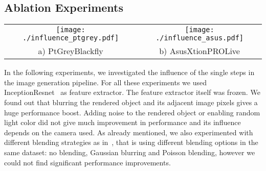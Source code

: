 \documentclass[10pt,twocolumn,letterpaper]{article}
\newcommand{\asus}[0]{AsusXtionPROLive\xspace}
\newcommand{\ptgrey}[0]{PtGreyBlackfly\xspace}
\begin{document}


\subsection{Ablation Experiments}
\label{sec:influence}

\begin{figure*}[ht]
\begin{center}
\begin{tabular}{cc}
\texttt{[image: ./influence\_ptgrey.pdf]} &
\texttt{[image: ./influence\_asus.pdf]} \\
a) \ptgrey &
b) \asus \\
\end{tabular}
\end{center}
\caption{\label{fig:influence} Influences  of the different building  blocks for
  synthetic  rendering for  the \ptgrey  and  the \asus  cameras.  Results  were
  obtained   with   InceptionResnet~\cite{inception_resnet}   as   the   feature
  extractor. Blurring is clearly a useful yet simple operation to apply to the
  synthetic images to improve the results.}
\end{figure*}

In the following experiments, we investigated  the influence of the single steps
in  the  image   generation  pipeline.   For  all  these   experiments  we  used
InceptionResnet~\cite{inception_resnet}  as  feature   extractor.   The  feature
extractor itself was frozen.  We found out that blurring the rendered object and
its adjacent image  pixels gives a huge performance boost.   Adding noise to the
rendered object or enabling random light  color did not give much improvement in
performance and its influence depends on the camera used.  As already mentioned,
we also experimented with  different blending strategies as in~\cite{Dwibedi17},
that  is using  different blending  options in  the same  dataset: no  blending,
Gaussian blurring  and Poisson blending,  however we could not  find significant
performance improvements.
\end{document}
